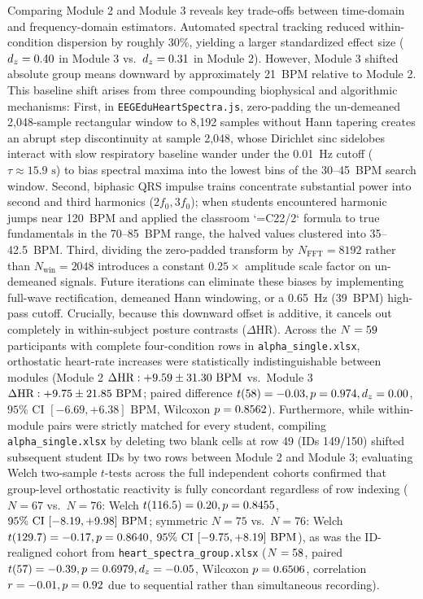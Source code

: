 \documentclass[11pt,letterpaper]{article}
\providecommand{\BothECGDiffCILow}{-6.69}
\providecommand{\BothECGDiffCIHigh}{+6.38}
\providecommand{\BothECGDiffDz}{0.00}
\begin{document}
Comparing Module 2 and Module 3 reveals key trade-offs between time-domain and frequency-domain estimators. Automated spectral tracking reduced within-condition dispersion by roughly 30\%, yielding a larger standardized effect size ($d_z = 0.40$ in Module 3 vs.\ $d_z = 0.31$ in Module 2). However, Module 3 shifted absolute group means downward by approximately 21~BPM relative to Module 2. This baseline shift arises from three compounding biophysical and algorithmic mechanisms: First, in \texttt{EEGEduHeartSpectra.js}, zero-padding the un-demeaned 2,048-sample rectangular window to 8,192 samples without Hann tapering creates an abrupt step discontinuity at sample 2,048, whose Dirichlet sinc sidelobes interact with slow respiratory baseline wander under the 0.01~Hz cutoff ($\tau \approx 15.9\text{ s}$) to bias spectral maxima into the lowest bins of the 30--45~BPM search window. Second, biphasic QRS impulse trains concentrate substantial power into second and third harmonics ($2f_0, 3f_0$); when students encountered harmonic jumps near 120~BPM and applied the classroom `=C22/2` formula to true fundamentals in the 70--85~BPM range, the halved values clustered into 35--42.5~BPM. Third, dividing the zero-padded transform by $N_{\text{FFT}} = 8192$ rather than $N_{\text{win}} = 2048$ introduces a constant $0.25\times$ amplitude scale factor on un-demeaned signals. Future iterations can eliminate these biases by implementing full-wave rectification, demeaned Hann windowing, or a 0.65~Hz (39~BPM) high-pass cutoff. Crucially, because this downward offset is additive, it cancels out completely in within-subject posture contrasts ($\Delta\text{HR}$). Across the $N = 59$ participants with complete four-condition rows in \texttt{alpha\_single.xlsx}, orthostatic heart-rate increases were statistically indistinguishable between modules (Module 2 $\Delta\text{HR}: +9.59 \pm 31.30\text{ BPM}$ vs.\ Module 3 $\Delta\text{HR}: +9.75 \pm 21.85\text{ BPM}$; paired difference $t(\BothECGDF) = \BothECGDiffT, p = \BothECGDiffP, d_z = \BothECGDiffDz$, $95\%\text{ CI } [\BothECGDiffCILow, \BothECGDiffCIHigh]\text{ BPM}$, Wilcoxon $p = 0.8562$). Furthermore, while within-module pairs were strictly matched for every student, compiling \texttt{alpha\_single.xlsx} by deleting two blank cells at row 49 (IDs 149/150) shifted subsequent student IDs by two rows between Module 2 and Module 3; evaluating Welch two-sample $t$-tests across the full independent cohorts confirmed that group-level orthostatic reactivity is fully concordant regardless of row indexing ($N = 67$ vs.\ $N = 76$: Welch $t(116.5) = 0.20, p = 0.8455$, $95\%\text{ CI } [-8.19, +9.98]\text{ BPM}$; symmetric $N = 75$ vs.\ $N = 76$: Welch $t(129.7) = -0.17, p = 0.8640$, $95\%\text{ CI } [-9.75, +8.19]\text{ BPM}$), as was the ID-realigned cohort from \texttt{heart\_spectra\_group.xlsx} ($N = 58$, paired $t(57) = -0.39, p = 0.6979, d_z = -0.05$, Wilcoxon $p = 0.6506$, correlation $r = -0.01, p = 0.92$ due to sequential rather than simultaneous recording).
\end{document}
